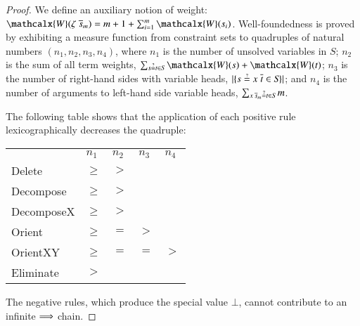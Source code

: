       \begin{proof}
      We define an auxiliary notion of weight:
      $\mathcalx{W}(\zeta \; \tuple{s}{m}) =
        \allowbreak m + 1 + \sum_{i=1}^{m} \mathcalx{W}(s_i)$.
      Well-foundedness is proved by exhibiting a measure function from
      constraint sets to quadruples of natural numbers $(n_1, n_2, n_3, n_4)$,
      where
      $n_1$ is the number of unsolved variables in $\mathit{S}$;
      $n_2$ is the sum of all term weights,
      $\sum_{s \unif t \in \mathit{S}} \mathcalx{W}(s) + \mathcalx{W}(t)$;
      $n_3$ is the number of right-hand sides with variable heads,
      $|\{ s \unif x \; \overline{t} \in \mathit{S} \} |$; and
      $n_4$ is the number of arguments to left-hand side variable heads,
        $\sum_{x \> \tuple{s}{m} \unif t  \in \mathit{S}} m$.
  
      The following table shows that the application of each positive rule
      lexicographically decreases the quadruple:
  
        \begin{center}
          \begin{tabular}{l@{\qquad}l@{\quad}l@{\quad}l@{\quad}l@{\quad}}
                              & $n_1$  & $n_2$ & $n_3$ & $n_4$ \\[\jot]
          \textsf{Delete}     & $\geq$ & $>$   &       &       \\
          \textsf{Decompose}  & $\geq$ & $>$   &       &       \\
          \textsf{DecomposeX} & $\geq$ & $>$   &       &       \\
          \textsf{Orient}     & $\geq$ & $=$   & $>$   &       \\
          \textsf{OrientXY}   & $\geq$ & $=$   & $=$   & $>$   \\
          \textsf{Eliminate}  & $>$    &       &       &
          \end{tabular}
        \end{center}
      The negative rules, which produce the special value $\bot$, cannot
      contribute to an infinite $\Longrightarrow$ chain.
      \end{proof}
  
